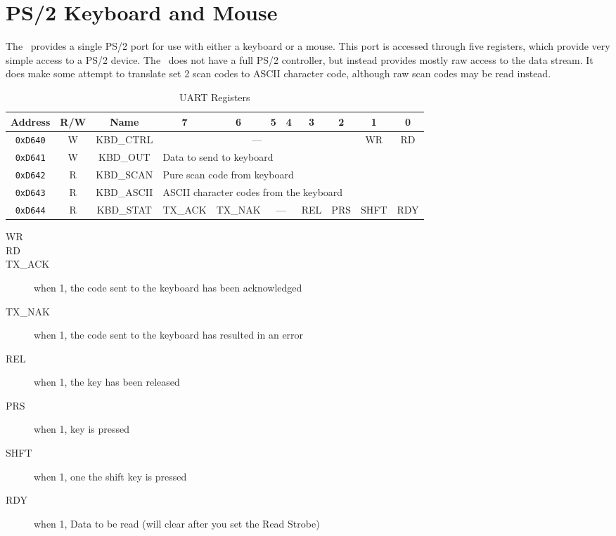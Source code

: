 \chapter{PS/2 Keyboard and Mouse}

The \jr\ provides a single PS/2 port for use with either a keyboard or a mouse. This port is accessed through five registers, which provide very simple access to a PS/2 device. The \jr\ does not have a full PS/2 controller, but instead provides mostly raw access to the data stream. It does make some attempt to translate set 2 scan codes to ASCII character code, although raw scan codes may be read instead.

\begin{table}[h]
    \begin{center}
        \begin{tabular}{|c|c|c|c|c|c|c|c|c|c|c|} \hline
            Address & R/W & Name & 7 & 6 & 5 & 4 & 3 & 2 & 1 & 0 \\\hline\hline
            \verb+0xD640+ & W & KBD\_CTRL & \multicolumn{6}{|c|}{---} & WR & RD \\\hline
            \verb+0xD641+ & W & KBD\_OUT & \multicolumn{8}{|l|}{Data to send to keyboard} \\ \hline
            \verb+0xD642+ & R & KBD\_SCAN & \multicolumn{8}{|l|}{Pure scan code from keyboard} \\ \hline
            \verb+0xD643+ & R & KBD\_ASCII & \multicolumn{8}{|l|}{ASCII character codes from the keyboard} \\ \hline
            \verb+0xD644+ & R & KBD\_STAT & TX\_ACK & TX\_NAK & \multicolumn{2}{|c|}{---} & REL & PRS & SHFT & RDY \\ \hline
        \end{tabular}
    \end{center}
    \caption{UART Registers}
    \label{tab:ps2_reg}
\end{table}

\begin{description}
    \item[WR]
    \item[RD]
    \item[TX\_ACK] when 1, the code sent to the keyboard has been acknowledged
    \item[TX\_NAK] when 1, the code sent to the keyboard has resulted in an error
    \item[REL] when 1, the key has been released
    \item[PRS] when 1, key is pressed
    \item[SHFT] when 1, one the shift key is pressed
    \item[RDY] when 1, Data to be read (will clear after you set the Read Strobe)   
\end{description}